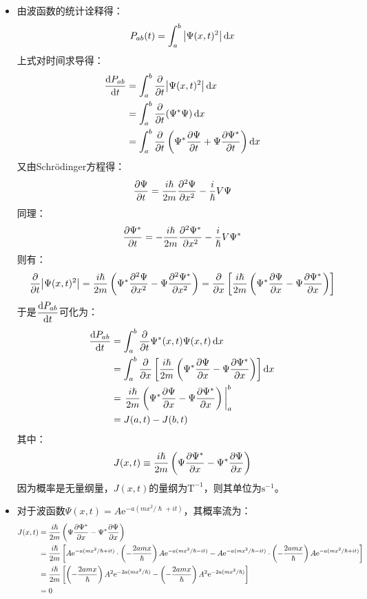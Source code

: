 \documentclass[a4paper,fontset=none]{ctexart}
\renewcommand\hbar\hslash
\begin{document}
\begin{itemize}
        \bigskip
        \item[14.(a)]
        由波函数的统计诠释得：
        \[
            P_{ab}(t) = \int_a^b \abs{\Psi(x,t)^2} \dd{x}
        \]
        上式对时间求导得：
        \begin{align*}
            \dv{P_{ab}}{t}
            &= \int_a^b \pdv{t} \abs{\Psi(x,t)^2} \dd{x} \\
            &= \int_a^b \pdv{t} (\Psi^* \Psi) \dd{x} \\
            &= \int_a^b \pdv{t} \left(\Psi^* \pdv{\Psi}{t} + \Psi \pdv{\Psi^*}{t}\right) \dd{x}
        \end{align*}
        又由Schrödinger方程得：
        \[
            \pdv{\Psi}{t} = \frac{i\hbar}{2m} \pdv[2]{\Psi}{x} - \frac{i}{\hbar}V\Psi
        \]
        同理：
        \[
            \pdv{\Psi^*}{t} = -\frac{i\hbar}{2m} \pdv[2]{\Psi^*}{x} - \frac{i}{\hbar}V\Psi^*
        \]
        则有：
        \[
            \pdv{t}\abs{\Psi(x,t)^2}
            = \frac{i\hbar}{2m} \left(\Psi^* \pdv[2]{\Psi}{x} - \Psi \pdv[2]{\Psi^*}{x}\right)
            = \pdv{x} \left[\frac{i\hbar}{2m} \left(\Psi^* \pdv{\Psi}{x} - \Psi \pdv{\Psi^*}{x}\right)\right]
        \]
        于是$\displaystyle \dv{P_{ab}}{t}$可化为：
        \begin{align*}
            \dv{P_{ab}}{t}
            &= \int_a^b \pdv{t} \Psi^*(x,t) \Psi(x,t) \dd{x} \\
            &= \int_a^b \pdv{x} \left[\frac{i\hbar}{2m} \left(\Psi^* \pdv{\Psi}{x} - \Psi \pdv{\Psi^*}{x}\right)\right] \dd{x} \\
            &= \eval{\frac{i\hbar}{2m} \left(\Psi^* \pdv{\Psi}{x} - \Psi \pdv{\Psi^*}{x}\right)}_a^b \\
            &= J(a,t) - J(b,t)
        \end{align*}
        其中：
        \[
            J(x,t) \equiv \frac{i\hbar}{2m} \left(\Psi \pdv{\Psi^*}{x} - \Psi^* \pdv{\Psi}{x}\right)
        \]
        因为概率是无量纲量，$J(x,t)$的量纲为$\mathrm{T}^{-1}$，则其单位为$\mathrm{s}^{-1}$。

        \item[14.(b)]
        对于波函数$\Psi(x,t) = A \mathrm{e}^{-a(mx^2/\hbar + it)}$，其概率流为：
        \begin{align*}
            J(x,t)
            &= \frac{i\hbar}{2m} \left(\Psi \pdv{\Psi^*}{x} - \Psi^* \pdv{\Psi}{x}\right) \\
            &= \frac{i\hbar}{2m} \left[A \mathrm{e}^{-a(mx^2/\hbar + it)} \cdot \left(-\frac{2amx}{\hbar}\right) A \mathrm{e}^{-a(mx^2/\hbar - it)} - A \mathrm{e}^{-a(mx^2/\hbar - it)} \cdot \left(-\frac{2amx}{\hbar}\right) A \mathrm{e}^{-a(mx^2/\hbar + it)}\right] \\
            &= \frac{i\hbar}{2m} \left[\left(-\frac{2amx}{\hbar}\right) A^2 \mathrm{e}^{-2a(mx^2/\hbar)} - \left(-\frac{2amx}{\hbar}\right) A^2 \mathrm{e}^{-2a(mx^2/\hbar)}\right] \\
            &= 0
        \end{align*}


\end{itemize}
\end{document}
